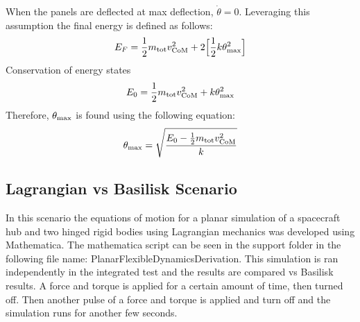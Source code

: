 When the panels are deflected at max deflection, $\dot{\theta} = 0$. Leveraging this assumption the final energy is defined as follows:
\begin{equation}
E_F = \frac{1}{2} m_{\textnormal{tot}} v_{\textnormal{CoM}}^2 + 2\Big[\frac{1}{2} k \theta_{\textnormal{max}}^2\Big]
\end{equation}
Conservation of energy states
\begin{equation}
E_0 = \frac{1}{2} m_{\textnormal{tot}} v_{\textnormal{CoM}}^2 + k \theta_{\textnormal{max}}^2
\end{equation}
Therefore, $\theta_{\textnormal{max}}$ is found using the following equation:
\begin{equation}
\theta_{\textnormal{max}} = \sqrt{\frac{E_0 - \frac{1}{2} m_{\textnormal{tot}} v_{\textnormal{CoM}}^2}{k}}
\end{equation}

\subsection{Lagrangian vs Basilisk Scenario}

In this scenario the equations of motion for a planar simulation of a spacecraft hub and two hinged rigid bodies using Lagrangian mechanics was developed using Mathematica. The mathematica script can be seen in the support folder in the following file name: PlanarFlexibleDynamicsDerivation. This simulation is ran independently in the integrated test and the results are compared vs Basilisk results. A force and torque is applied for a certain amount of time, then turned off. Then another pulse of a force and torque is applied and turn off and the simulation runs for another few seconds.



